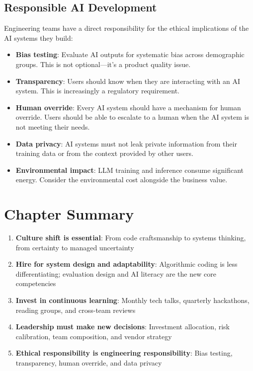 \subsection{Responsible AI Development}

Engineering teams have a direct responsibility for the ethical implications of the AI systems they build:

\begin{itemize}[leftmargin=*]
    \item \textbf{Bias testing}: Evaluate AI outputs for systematic bias across demographic groups. This is not optional---it's a product quality issue.
    \item \textbf{Transparency}: Users should know when they are interacting with an AI system. This is increasingly a regulatory requirement.
    \item \textbf{Human override}: Every AI system should have a mechanism for human override. Users should be able to escalate to a human when the AI system is not meeting their needs.
    \item \textbf{Data privacy}: AI systems must not leak private information from their training data or from the context provided by other users.
    \item \textbf{Environmental impact}: LLM training and inference consume significant energy. Consider the environmental cost alongside the business value.
\end{itemize}


\section{Chapter Summary}

\begin{enumerate}[leftmargin=*]
    \item \textbf{Culture shift is essential}: From code craftsmanship to systems thinking, from certainty to managed uncertainty
    \item \textbf{Hire for system design and adaptability}: Algorithmic coding is less differentiating; evaluation design and AI literacy are the new core competencies
    \item \textbf{Invest in continuous learning}: Monthly tech talks, quarterly hackathons, reading groups, and cross-team reviews
    \item \textbf{Leadership must make new decisions}: Investment allocation, risk calibration, team composition, and vendor strategy
    \item \textbf{Ethical responsibility is engineering responsibility}: Bias testing, transparency, human override, and data privacy
\end{enumerate}
